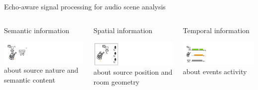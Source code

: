 \begin{frame}[t]{Echo-aware signal processing for \alert{audio scene analysis}}

    \begin{columns}
        \begin{column}[t]{0.3\textwidth}
            \centering
            \alert{Semantic} information

            \vspace*{0.5em}
            \includegraphics[trim={0 0 170em 0},clip,width=\textwidth]{figures/semantic.png}
            about source nature and semantic content
        \end{column}
        \begin{column}[t]{0.3\textwidth}
            \centering
            \alert{Spatial} information

            \vspace*{0.5em}
            \includegraphics[trim={0 0 170em 0},clip,width=\textwidth]{figures/spatial.png}
            about source position and room geometry
        \end{column}
        \begin{column}[t]{0.3\textwidth}
            \centering
            \alert{Temporal} information

            \vspace*{0.5em}
            \includegraphics[trim={0 0 170em 0},clip,width=\textwidth]{figures/temporal.png}
            about events activity
        \end{column}
    \end{columns}


\end{frame}
